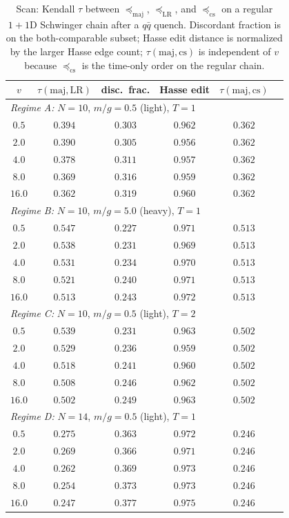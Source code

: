 \documentclass[11pt,a4paper]{article}
\theoremstyle{definition}
\theoremstyle{plain}
\theoremstyle{remark}
\newcommand{\maj}{\mathrm{maj}}
\newcommand{\LR}{\mathrm{LR}}
\newcommand{\cs}{\mathrm{cs}}
\begin{document}
\begin{table}[t]
\centering
\small
\renewcommand{\arraystretch}{1.05}
\begin{tabular}{cccccc}
\toprule
$v$ & $\tau(\maj,\LR)$ & disc.\ frac. & Hasse edit & $\tau(\maj,\cs)$ \\
\midrule
\multicolumn{5}{l}{\emph{Regime A:} $N=10$, $m/g=0.5$ (light), $T=1$} \\
$0.5$ & $0.394$ & $0.303$ & $0.962$ & $0.362$ \\
$2.0$ & $0.390$ & $0.305$ & $0.956$ & $0.362$ \\
$4.0$ & $0.378$ & $0.311$ & $0.957$ & $0.362$ \\
$8.0$ & $0.369$ & $0.316$ & $0.959$ & $0.362$ \\
$16.0$ & $0.362$ & $0.319$ & $0.960$ & $0.362$ \\
\midrule
\multicolumn{5}{l}{\emph{Regime B:} $N=10$, $m/g=5.0$ (heavy), $T=1$} \\
$0.5$ & $0.547$ & $0.227$ & $0.971$ & $0.513$ \\
$2.0$ & $0.538$ & $0.231$ & $0.969$ & $0.513$ \\
$4.0$ & $0.531$ & $0.234$ & $0.970$ & $0.513$ \\
$8.0$ & $0.521$ & $0.240$ & $0.971$ & $0.513$ \\
$16.0$ & $0.513$ & $0.243$ & $0.972$ & $0.513$ \\
\midrule
\multicolumn{5}{l}{\emph{Regime C:} $N=10$, $m/g=0.5$ (light), $T=2$} \\
$0.5$ & $0.539$ & $0.231$ & $0.963$ & $0.502$ \\
$2.0$ & $0.529$ & $0.236$ & $0.959$ & $0.502$ \\
$4.0$ & $0.518$ & $0.241$ & $0.960$ & $0.502$ \\
$8.0$ & $0.508$ & $0.246$ & $0.962$ & $0.502$ \\
$16.0$ & $0.502$ & $0.249$ & $0.963$ & $0.502$ \\
\midrule
\multicolumn{5}{l}{\emph{Regime D:} $N=14$, $m/g=0.5$ (light), $T=1$} \\
$0.5$ & $0.275$ & $0.363$ & $0.972$ & $0.246$ \\
$2.0$ & $0.269$ & $0.366$ & $0.971$ & $0.246$ \\
$4.0$ & $0.262$ & $0.369$ & $0.973$ & $0.246$ \\
$8.0$ & $0.254$ & $0.373$ & $0.973$ & $0.246$ \\
$16.0$ & $0.247$ & $0.377$ & $0.975$ & $0.246$ \\
\bottomrule
\end{tabular}
\caption{Scan: Kendall $\tau$ between
$\preceq_{\maj}$, $\preceq_{\LR}$, and $\preceq_{\cs}$ on a regular
$1{+}1$D Schwinger chain after a $q\bar q$ quench.  Discordant
fraction is on the both-comparable subset; Hasse edit distance is
normalized by the larger Hasse edge count; $\tau(\maj,\cs)$ is
independent of $v$ because $\preceq_{\cs}$ is the time-only order
on the regular chain.}
\label{tab:scan}
\end{table}
\end{document}
